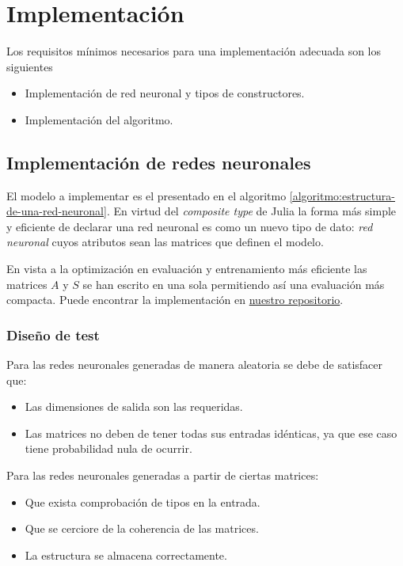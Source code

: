 
\section{Implementación}
\label{ch07:Implementar} 

Los requisitos mínimos necesarios para una implementación adecuada son los siguientes
\begin{itemize}
    \item Implementación de red neuronal y tipos de constructores.
    \item Implementación del algoritmo. 
\end{itemize}

\subsection{Implementación de redes neuronales}

El modelo  a implementar es el presentado en el algoritmo \ref{algoritmo:estructura-de-una-red-neuronal}. En virtud del \textit{composite type} de Julia  la forma más simple y eficiente de 
declarar una red neuronal es como un nuevo tipo de dato: \textit{red neuronal} cuyos atributos sean las matrices que definen el modelo. 

En vista a la optimización en evaluación y 
entrenamiento más eficiente las matrices 
$A$ y $S$ se han escrito en una sola permitiendo así una evaluación más compacta. 
Puede encontrar la implementación 
en \href{https://github.com/BlancaCC/TFG-Estudio-de-las-redes-neuronales/tree/main/OptimizedNeuralNetwork.jl/src}{nuestro repositorio}.
\subsubsection{Diseño de test} 
Para las redes neuronales generadas de manera aleatoria se debe de satisfacer que: 
\begin{itemize}
    \item Las dimensiones de salida son las requeridas.
    \item Las matrices no deben de tener todas sus entradas idénticas, ya que ese caso tiene probabilidad nula de ocurrir. 
\end{itemize}

Para las redes neuronales generadas a partir de 
ciertas matrices: 
\begin{itemize}
    \item Que exista comprobación de tipos en la entrada.
    \item Que se cerciore de la coherencia de las matrices.
    \item  La estructura se almacena correctamente. 
\end{itemize}

